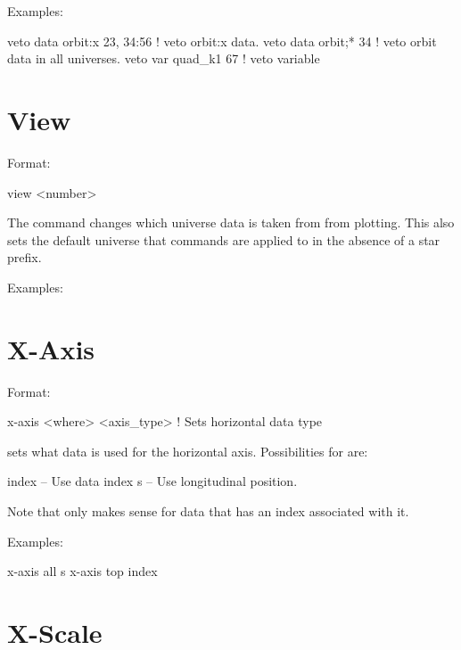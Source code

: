 Examples:
\begin{example}
  veto data orbit:x  23, 34:56 ! veto orbit:x data.
  veto data orbit;* 34         ! veto orbit data in all universes.
  veto var quad_k1 67          ! veto variable
\end{example}

\section{View}
\label{s:view}

Format:
\begin{example}
  view <number>
\end{example}

\vskip 0.2in 
The  command changes which universe data is taken from from
plotting.  This also sets the default universe that commands are
applied to in the absence of a star prefix.

Examples:

\section{X-Axis}
\label{s:x-axis}

Format:
\begin{example}
  x-axis <where> <axis_type> ! Sets horizontal data type
\end{example}

\vskip 0.2in 
 sets what data is used for the horizontal
axis. Possibilities for  are:
\begin{example}
  index    -- Use data index
  s        -- Use longitudinal position.
\end{example}
Note that  only makes sense for data that has an index
associated with it.

Examples:
\begin{example}
  x-axis all s
  x-axis top index
\end{example}

\section{X-Scale}
\label{s:x-scale}

